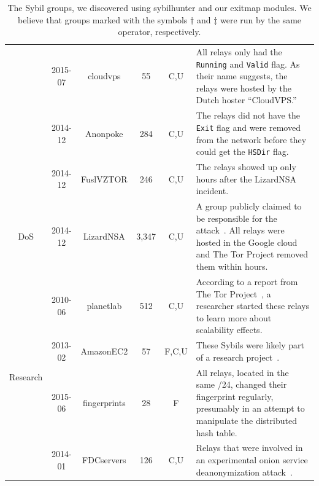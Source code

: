 \begin{table}[t]
\begin{tabularx}{\textwidth}{c|c c c c X}
& 2015-07 & cloudvps & 55 & C,U & All relays only had the \texttt{Running} and
\texttt{Valid} flag.  As their name suggests, the relays were hosted by the
Dutch hoster ``CloudVPS.'' \\

& 2014-12 & Anonpoke & 284 & C,U & The relays did not have the \texttt{Exit} flag
and were removed from the network before they could get the \texttt{HSDir} flag.
\\

& 2014-12 & FuslVZTOR & 246 & C,U & The relays showed up only hours after the
LizardNSA incident. \\

\hline

\multirow{1}{*}{DoS}
& 2014-12 & LizardNSA & 3,347 & C,U & A group publicly claimed to be responsible
for the attack~\cite{lizards}.  All relays were hosted in the Google cloud and
The Tor Project removed them within hours. \\

\hline

\multirow{4}{*}{Research}
& 2010-06 & planetlab & 512 & C,U & According to a report from The Tor
Project~\cite{progressreport}, a researcher started these relays to learn more
about scalability effects. \\

& 2013-02 & AmazonEC2 & 57 & F,C,U & These Sybils were likely part of a research
project~\cite{Biryukov2013a}. \\

& 2015-06 & fingerprints & 28 & F & All relays, located in the same /24, changed
their fingerprint regularly, presumably in an attempt to manipulate the
distributed hash table. \\

& 2014-01 & FDCservers & 126 & C,U & Relays that were involved in an
experimental onion service deanonymization attack~\cite{cmucert}. \\
\hline

\end{tabularx}
\caption{The Sybil groups, we discovered using sybilhunter and our exitmap
modules.  We believe that groups marked with the
symbols $\dagger$ and $\ddagger$ were run by the same operator, respectively.}
\label{tab:sybils}
\end{table}

